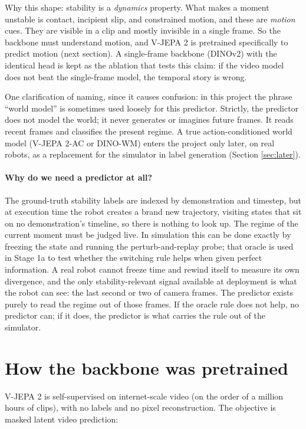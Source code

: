 \documentclass[11pt]{article}
\begin{document}
Why this shape: stability is a \emph{dynamics} property. What makes a moment unstable
is contact, incipient slip, and constrained motion, and these are \emph{motion} cues.
They are visible in a clip and mostly invisible in a single frame. So the backbone
must understand motion, and V-JEPA 2 is pretrained specifically to predict motion
(next section). A single-frame backbone (DINOv2) with the identical head is kept as
the ablation that tests this claim: if the video model does not beat the single-frame
model, the temporal story is wrong.

One clarification of naming, since it causes confusion: in this project the phrase
``world model'' is sometimes used loosely for this predictor. Strictly, the predictor
does not model the world; it never generates or imagines future frames. It reads
recent frames and classifies the present regime. A true action-conditioned world
model (V-JEPA 2-AC or DINO-WM) enters the project only later, on real robots, as a
replacement for the simulator in label generation (Section \ref{sec:later}).

\paragraph{Why do we need a predictor at all?} The ground-truth stability labels
are indexed by demonstration and timestep, but at execution time the robot creates a
brand new trajectory, visiting states that sit on no demonstration's timeline, so
there is nothing to look up. The regime of the current moment must be judged live.
In simulation this can be done exactly by freezing the state and running the
perturb-and-replay probe; that oracle is used in Stage 1a to test whether the
switching rule helps when given perfect information. A real robot cannot freeze time
and rewind itself to measure its own divergence, and the only stability-relevant
signal available at deployment is what the robot can see: the last second or two of
camera frames. The predictor exists purely to read the regime out of those frames.
If the oracle rule does not help, no predictor can; if it does, the predictor is
what carries the rule out of the simulator.

\section{How the backbone was pretrained}

V-JEPA 2 is self-supervised on internet-scale video (on the order of a million hours
of clips), with no labels and no pixel reconstruction. The objective is masked
latent video prediction:
\end{document}
